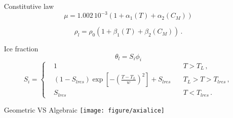 \documentclass{beamer}
\begin{document}
\begin{frame}{Constitutive law}
		\begin{equation*}
			\mu=1.002\, 10^{-3} \left( 1+ \alpha_1(T) +\alpha_2(C_M) \right)
		\end{equation*}
		 
		\begin{equation*}
			\rho_l =  \rho_0(1+\beta_1(T)+ \beta_2(C_M) )\, .
			\label{consrho}
		\end{equation*}
\end{frame}
\begin{frame}{Ice fraction}
\begin{equation*}
\theta_l =S_i \phi_i
\end{equation*} 
\begin{equation*}
S_i=\left\{
\begin{aligned}
&1 \quad & T > T_L \,,\\
&(1-S_{lres})\exp\left[ - \left( \frac{T-T_L}{w}\right)^2 \right] +
S_{lres} \quad & T_L> T > T_{lres}\,,\\
&S_{lres}  \quad &  T < T_{lres}\,.
\end{aligned}
\right.
\end{equation*}
\end{frame}
\begin{frame}{Geometric VS Algebraic}
\centering
\texttt{[image: figure/axialice]}
\end{frame}
\end{document}
